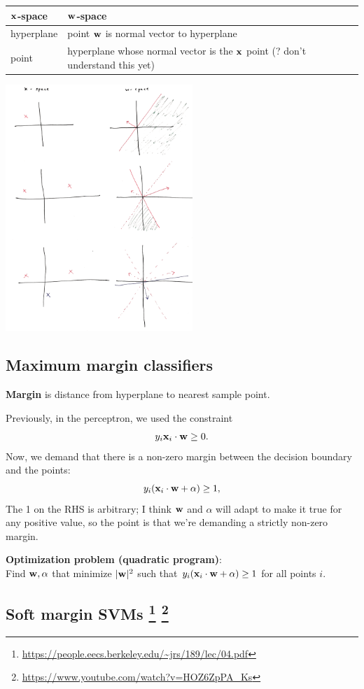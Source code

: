 \documentclass[12pt]{article}
\begin{document}
\begin{tabular}{l|l}
  $\mathbf x$-space    & $\mathbf w$-space \\
  \hline
  hyperplane & point $\mathbf w$ is normal vector to hyperplane \\
  point      & hyperplane whose normal vector is the $\mathbf x$ point (? don't understand this yet)
\end{tabular}

\includegraphics[width=200pt]{img/ml-perceptron-x-space-w-space.png}

\subsection*{Maximum margin classifiers}
\textbf{Margin} is distance from hyperplane to nearest sample point.

Previously, in the perceptron, we used the constraint
$$y_i \mathbf x_i \cdot \mathbf w \geq 0.$$
Now, we demand that there is a non-zero margin between the decision boundary
and the points:
$$y_i (\mathbf x_i \cdot \mathbf w + \alpha) \geq 1,$$
The 1 on the RHS is arbitrary; I think $\mathbf w$ and $\alpha$ will adapt to make it
true for any positive value, so the point is that we're demanding a strictly
non-zero margin.
\\
\begin{mdframed}
  \textbf{Optimization problem (quadratic program)}:\\
    Find $\mathbf w, \alpha$ that minimize $|\mathbf w|^2$ such that
    $y_i(\mathbf x_i \cdot \mathbf w + \alpha) \geq 1$ for all points $i$.
\end{mdframed}

\subsection*{Soft margin SVMs
\footnote{\url{https://people.eecs.berkeley.edu/~jrs/189/lec/04.pdf}}
\footnote{ \url{https://www.youtube.com/watch?v=HOZ6ZpPA_Ks}}
}
\end{document}
